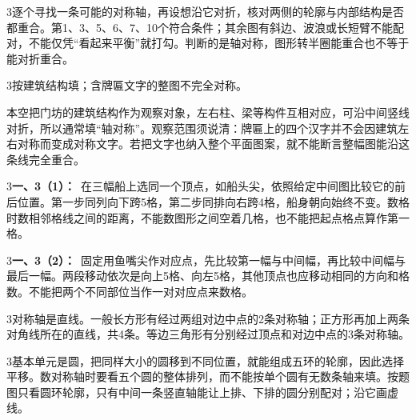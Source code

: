 \documentclass[multi=snippet,border={5bp 20bp 5bp 5bp}]{standalone}
\newenvironment{snippet}[3]{\begin{minipage}{#1bp}\color{answerred}\fontsize{#2}{#3}\selectfont\raggedright}{\end{minipage}}
\begin{document}
\begin{snippet}{505}{11.5}{14}\begin{multicols}{3}\raggedcolumns 逐个寻找一条可能的对称轴，再设想沿它对折，核对两侧的轮廓与内部结构是否都重合。第1、3、5、6、7、10个符合条件；其余图有斜边、波浪或长短臂不能配对，不能仅凭“看起来平衡”就打勾。判断的是轴对称，图形转半圈能重合也不等于能对折重合。\end{multicols}\end{snippet}
\begin{snippet}{505}{11.5}{14}\begin{multicols}{3}\raggedcolumns 按建筑结构填；含牌匾文字的整图不完全对称。\par 本空把门坊的建筑结构作为观察对象，左右柱、梁等构件互相对应，可沿中间竖线对折，所以通常填“轴对称”。观察范围须说清：牌匾上的四个汉字并不会因建筑左右对称而变成对称文字。若把文字也纳入整个平面图案，就不能断言整幅图能沿这条线完全重合。\end{multicols}\end{snippet}
\begin{snippet}{505}{11.5}{14}\begin{multicols}{3}\raggedcolumns \textbf{一、3（1）：}\ 在三幅船上选同一个顶点，如船头尖，依照给定中间图比较它的前后位置。第一步同列向下跨5格，第二步同排向右跨4格，船身朝向始终不变。数格时数相邻格线之间的距离，不能数图形之间空着几格，也不能把起点格点算作第一格。\end{multicols}\end{snippet}
\begin{snippet}{505}{11.5}{14}\begin{multicols}{3}\raggedcolumns \textbf{一、3（2）：}\ 固定用鱼嘴尖作对应点，先比较第一幅与中间幅，再比较中间幅与最后一幅。两段移动依次是向上5格、向左5格，其他顶点也应移动相同的方向和格数。不能把两个不同部位当作一对对应点来数格。\end{multicols}\end{snippet}
\begin{snippet}{505}{11.5}{14}\begin{multicols}{3}\raggedcolumns 对称轴是直线。一般长方形有经过两组对边中点的2条对称轴；正方形再加上两条对角线所在的直线，共4条。等边三角形有分别经过顶点和对边中点的3条对称轴。\end{multicols}\end{snippet}
\begin{snippet}{505}{11.5}{14}\begin{multicols}{3}\raggedcolumns 基本单元是圆，把同样大小的圆移到不同位置，就能组成五环的轮廓，因此选择平移。数对称轴时要看五个圆的整体排列，而不能按单个圆有无数条轴来填。按题图只看圆环轮廓，只有中间一条竖直轴能让上排、下排的圆分别配对；沿它画虚线。\end{multicols}\end{snippet}
\end{document}
